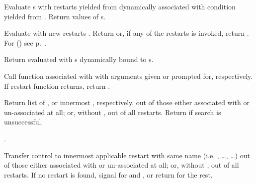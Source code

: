 \begin{LIST}{1cm}
  {
  Evaluate s with restarts yielded from 
  dynamically associated with  condition yielded from
  . Return values of s.
  }

  {
  Evaluate  with new restarts . Return
   or, if any of the restarts is invoked,
  return .
  For () see p.\ \pageref{section:Functions}.
  }

  {
  Return  evaluated with s 
  dynamically bound to s.
  }

  {
  Call function associated with  with arguments given or
  prompted for, respectively. If restart function returns, return .
  }

  {
  Return list of , or innermost 
  , respectively, out of those either associated
  with  or un-associated at all; or, without
  , out of all restarts. Return \retval{\NIL} if search
  is unsuccessful.
  }

  {
  .
  }

  {
  Transfer control to innermost applicable restart with same name
  (i.e. , \ldots,  \ldots) out of those either associated
  with  or un-associated at all; or, without
  , out of all restarts. If no restart is found,
  signal  for  and ,
  or return \retval{\NIL} for the rest.
  }


\end{LIST}
